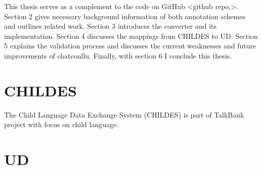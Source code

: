 This thesis serves as a complement to the code on GitHub <github repo,>. Section 2 gives necessary background information of both annotation schemes and outlines related work. Section 3 introduces the converter and its implementation. Section 4 discusses the mappings from CHILDES to UD. Section 5 explains the validation process and discusses the current weaknesses and future improvements of chatconllu. Finally, with section 6 I conclude this thesis.



\section{CHILDES}

The Child Language Data Exchange System (CHILDES) is part of TalkBank project with focus on child language.

\section{UD}

